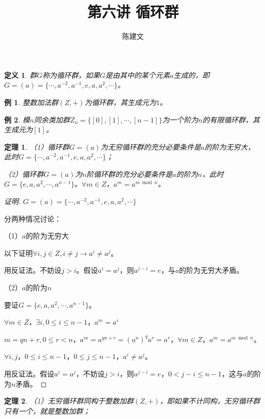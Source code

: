 \documentclass{article}
\newtheorem{Def}{定义}
\newtheorem{Thm}{定理}
\newtheorem*{Example}{例}
\begin{document}
\begin{CJK*}{UTF8}{gbsn}
  \title{第六讲 循环群}
  \author{陈建文}
  \maketitle
  \begin{Def}
    群$G$称为循环群，如果$G$是由其中的某个元素$a$生成的，即$G=(a)=\{\cdots,a^{-2},a^{-1},e,a,a^2,\cdots\}$。
  \end{Def}
  
  \begin{Example}
    整数加法群$(Z,+)$为循环群，其生成元为$1$。
  \end{Example}
  
  \begin{Example}
    模$n$同余类加群$Z_n=\{[0],[1],\cdots,[n-1]\}$为一个阶为$n$的有限循环群，其生成元为$[1]$。
  \end{Example}
  
  \begin{Thm}
    （1）循环群$G=(a)$为无穷循环群的充分必要条件是$a$的阶为无穷大，此时$G=\{\cdots,a^{-2},a^{-1},e,a,a^2,\cdots\}$；
    
    （2）循环群$G=(a)$为$n$阶循环群的充分必要条件是$a$的阶为$n$，此时$G=\{e,a,a^2,\cdots,a^{n-1}\}$。$\forall m\in Z$，$a^m=a^{m\bmod n}$。
  \end{Thm}
  \begin{proof}[证明]
    $G=(a)=\{\cdots,a^{-2},a^{-1},e,a,a^2,\cdots\}$
  
    分两种情况讨论：
  
    （1）$a$的阶为无穷大
  
    以下证明$\forall i,j\in Z,i\neq j\to a^i\neq a^j$。
  
    用反证法。不妨设$j>i$。假设$a^i=a^j$，则$a^{j-i}=e$，与$a$的阶为无穷大矛盾。
  
    （2）$a$的阶为$n$
  
    要证$G=\{e,a,a^2,\cdots,a^{n-1}\}$。
  
    $\forall m\in Z$，$\exists i,0\leq i \leq n-1$，$a^m=a^i$
  
    $m=qn+r,0\leq r < n$，$a^m=a^{qn+r}=(a^n)^qa^r=a^r$，$\forall m\in Z$，$a^m=a^{m\bmod n}$。
  
    $\forall i,j$，$0\leq i\leq n-1$，$0\leq j \leq n-1$，$a^i\neq a^j$。
  
    用反证法。假设$a^i=a^j$，不妨设$j>i$，则$a^{j-i}=e$，$0<j-i\leq n-1$，这与$a$的阶为$n$矛盾。
  \end{proof}
  \begin{Thm}
    （1）无穷循环群同构于整数加群$(Z,+)$，即如果不计同构，无穷循环群只有一个，就是整数加群；
    

\end{Thm}
\end{CJK*}
\end{document}
